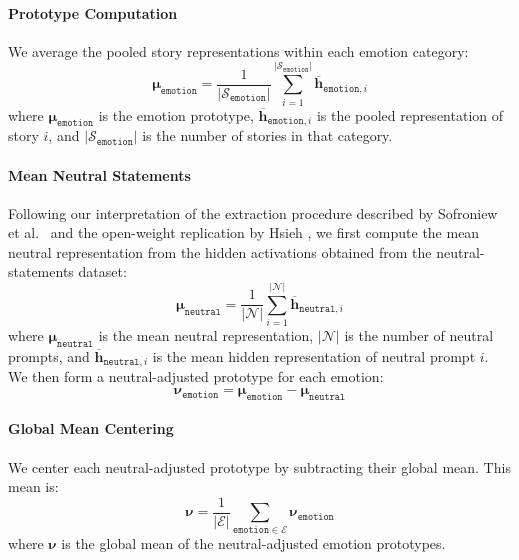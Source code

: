 \paragraph{Prototype Computation} We average the pooled story representations within each emotion category:
\begin{equation}
    \boldsymbol{\mu}_{\mathtt{emotion}}=\frac{1}{\left|\mathcal{S}_{\mathtt{emotion}}\right|}\sum_{i=1}^{\left|\mathcal{S}_\mathtt{emotion}\right|}\mathbf{\overline{h}}_{\mathtt{emotion},i}
    \label{eqtn:prototype-comp}
\end{equation}
where $\boldsymbol{\mu}_{\mathtt{emotion}}$ is the emotion prototype,
$\mathbf{\overline{h}}_{\mathtt{emotion},i}$ is the pooled representation of story $i$, and
$\left|\mathcal{S}_{\mathtt{emotion}}\right|$ is the number of stories in that category.

\paragraph{Mean Neutral Statements} Following our interpretation of the extraction procedure described by Sofroniew et al.\ \cite{sofroniew_emotion_2026} and the open-weight replication by Hsieh \cite{hsieh_replicating_2026}, we first compute the mean neutral representation from the hidden activations obtained from the neutral-statements dataset:
\begin{equation}
    \boldsymbol{\mu}_{\mathtt{neutral}}=\frac{1}{\left|\mathcal{N}\right|}\sum_{i=1}^{\left|\mathcal{N}\right|}\mathbf{\overline{h}}_{\mathtt{neutral},i}
    \label{eqtn:neutral-mean}
\end{equation}
where $\boldsymbol{\mu}_{\mathtt{neutral}}$ is the mean neutral representation, $\left|\mathcal{N}\right|$ is the number of neutral prompts, and
$\mathbf{\overline{h}}_{\mathtt{neutral},i}$ is the mean hidden representation of neutral prompt $i$. We then form a neutral-adjusted prototype 
for each emotion:
\begin{equation}
    \boldsymbol{\nu}_{\mathtt{emotion}}=\boldsymbol{\mu}_{\mathtt{emotion}}-\boldsymbol{\mu}_{\mathtt{neutral}}
    \label{eqtn:neutral-adjusted-prototype}
\end{equation}

\paragraph{Global Mean Centering} We center each neutral-adjusted prototype by subtracting their global mean. This mean is:
\begin{equation}
    \boldsymbol{\nu}=\frac{1}{|\mathcal{E}|}\sum_{{\mathtt{emotion}}\in \mathcal{E}}^{}\boldsymbol{\nu}_{\mathtt{emotion}}
    \label{eqtn:global-mean}
\end{equation}
where $\boldsymbol{\nu}$ is the global mean of the neutral-adjusted emotion prototypes.

